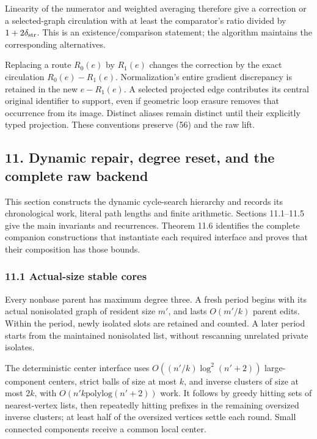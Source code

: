 Linearity of the numerator and weighted averaging therefore give a correction or a selected-graph circulation with at least the comparator's ratio divided by \(1+2\delta_{\rm str}\). This is an existence/comparison statement; the algorithm maintains the corresponding alternatives.

Replacing a route \(R_0(e)\) by \(R_1(e)\) changes the correction by the exact circulation \(R_0(e)-R_1(e)\). Normalization's entire gradient discrepancy is retained in the new \(e-R_1(e)\). A selected projected edge contributes its central original identifier to support, even if geometric loop erasure removes that occurrence from its image. Distinct aliases remain distinct until their explicitly typed projection. These conventions preserve (56) and the raw lift.

\hypertarget{af-46593eb93e-dynamic-repair-degree-reset-and-the-complete-raw-backend}{%
\subsection{11. Dynamic repair, degree reset, and the complete raw backend}\label{af-46593eb93e-dynamic-repair-degree-reset-and-the-complete-raw-backend}}

This section constructs the dynamic cycle-search hierarchy and records its chronological work, literal path lengths and finite arithmetic. Sections 11.1--11.5 give the main invariants and recurrences. Theorem 11.6 identifies the complete companion constructions that instantiate each required interface and proves that their composition has those bounds.

\hypertarget{af-46593eb93e-actual-size-stable-cores}{%
\subsubsection{11.1 Actual-size stable cores}\label{af-46593eb93e-actual-size-stable-cores}}

Every nonbase parent has maximum degree three. A fresh period begins with its actual nonisolated graph of resident size \(m'\), and lasts \(O(m'/k)\) parent edits. Within the period, newly isolated slots are retained and counted. A later period starts from the maintained nonisolated list, without rescanning unrelated private isolates.

The deterministic center interface uses \(O((n'/k)\log^2(n'+2))\) large-component centers, strict balls of size at most \(k\), and inverse clusters of size at most \(2k\), with \(O(n'k\mathrm{polylog}(n'+2))\) work. It follows by greedy hitting sets of nearest-vertex lists, then repeatedly hitting prefixes in the remaining oversized inverse clusters; at least half of the oversized vertices settle each round. Small connected components receive a common local center.

